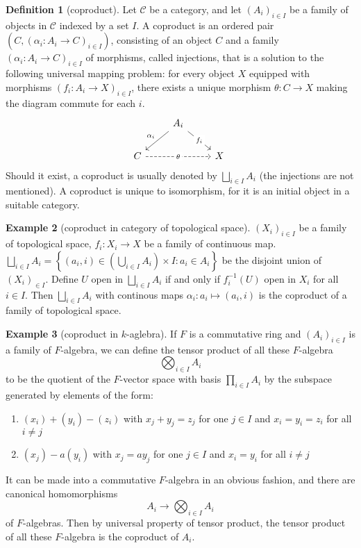 \documentclass[a4paper,12pt]{article}
\theoremstyle{definition}
\newtheorem{defn}{Definition}[subsection]
\newtheorem{exam}[defn]{Example}
\begin{document}
\begin{defn}[coproduct]
    Let $\mathcal{C}$ be a category, and let $\left(A_i\right)_{i \in I}$ be a family of objects in $\mathcal{C}$ indexed by a set $I$. A coproduct is an ordered pair $\left(C,\left(\alpha_i: A_i \rightarrow C\right)_{i \in I}\right)$, consisting of an object $C$ and a family $\left(\alpha_i: A_i \rightarrow C\right)_{i \in I}$ of morphisms, called injections, that is a solution to the following universal mapping problem: for every object $X$ equipped with morphisms $\left(f_i: A_i \rightarrow X\right)_{i \in I}$, there exists a unique morphism $\theta: C \rightarrow X$ making the diagram commute for each $i$.
    \begin{equation*}
        \begin{tikzcd}
            & {A_i} \\
            C && X
            \arrow["{\alpha_i}"', from=1-2, to=2-1]
            \arrow["\theta"{description}, dashed, from=2-1, to=2-3]
            \arrow["{f_i}"{description}, from=1-2, to=2-3]
        \end{tikzcd}\
    \end{equation*}
    Should it exist, a coproduct is usually denoted by $\bigsqcup_{i \in I} A_i$ (the injections are not mentioned). A coproduct is unique to isomorphism, for it is an initial object in a suitable category.
\end{defn}
\begin{exam}[coproduct in category of topological space]
    $(X_{i})_{i\in I}$ be a family of topological space, $f_{i}:X_i\rightarrow X$ be a family of continuous map. $\bigsqcup_{i \in I} A_i=\left\{\left(a_i, i\right) \in \left(\bigcup_{i \in I} A_i\right) \times I : a_i \in A_i\right\}$ be the disjoint union of $(X_i)_{\in I}$. Define $U$ open in $\bigsqcup_{i \in I} A_i$ if and only if $f_{i}^{-1}(U)$ open in $X_i$ for all $i\in I$. Then $\bigsqcup_{i \in I} A_i$ with continous maps $\alpha_i:a_i\mapsto (a_i,i)$ is the coproduct of a family of topological space.
\end{exam}
\begin{exam}[coproduct in $k$-aglebra]
    If $F$ is a commutative ring and $(A_i)_{i\in I}$ is a family of $F$-algebra, we can define the tensor product of all these $F$-algebra $$\bigotimes_{i\in I}A_i $$ to be the quotient of the $F$-vector space with basis $\prod_{i \in I} A_i$ by the subspace generated by elements of the form:
    \begin{enumerate}[(1)]
        \item  $\left(x_i\right)+\left(y_i\right)-\left(z_i\right)$ with $x_j+y_j=z_j$ for one $j \in I$ and $x_i=y_i=z_i$ for all $i \neq j$
        \item  $\left(x_j\right)-a\left(y_i\right)$ with $x_j=a y_j$ for one $j \in I$ and $x_i=y_i$ for all $i \neq j$
    \end{enumerate}
    It can be made into a commutative $F$-algebra in an obvious fashion, and there are canonical homomorphisms $$A_i \rightarrow \bigotimes_{i\in I} A_i$$ of $F$-algebras.
    Then by universal property of tensor product, the tensor product of all these $F$-algebra is the coproduct of $A_i$.
\end{exam}
\end{document}

